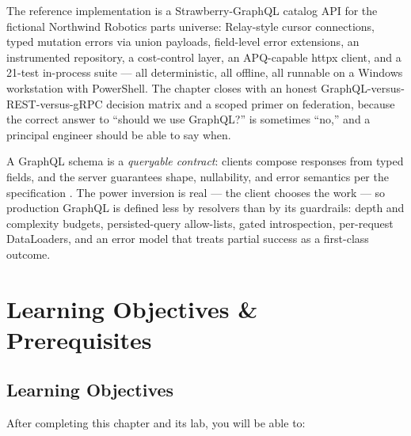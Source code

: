 The reference implementation is a Strawberry-GraphQL catalog API for the
fictional Northwind Robotics parts universe: Relay-style cursor
connections, typed mutation errors via union payloads, field-level error
extensions, an instrumented repository, a cost-control layer, an
APQ-capable httpx client, and a 21-test in-process suite --- all
deterministic, all offline, all runnable on a Windows workstation with
PowerShell. The chapter closes with an honest GraphQL-versus-REST-versus-gRPC
decision matrix and a scoped primer on federation, because the correct
answer to ``should we use GraphQL?'' is sometimes ``no,'' and a principal
engineer should be able to say when.

\begin{keyconceptbox}
A GraphQL schema is a \emph{queryable contract}: clients compose responses
from typed fields, and the server guarantees shape, nullability, and error
semantics per the specification \cite{graphqlspec}. The power inversion is
real --- the client chooses the work --- so production GraphQL is defined
less by resolvers than by its guardrails: depth and complexity budgets,
persisted-query allow-lists, gated introspection, per-request DataLoaders,
and an error model that treats partial success as a first-class outcome.
\end{keyconceptbox}

\section{Learning Objectives \& Prerequisites}
\label{sec:ch12-objectives}

\subsection{Learning Objectives}

After completing this chapter and its lab, you will be able to:

